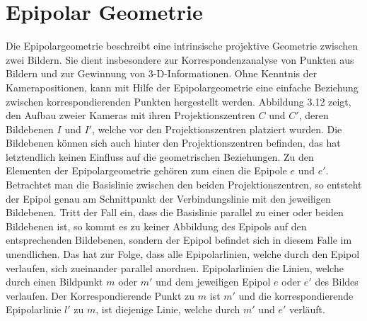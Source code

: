 \chapter{Epipolar Geometrie}


Die Epipolargeometrie beschreibt eine intrinsische projektive Geometrie zwischen zwei Bildern\cite{HZ}. Sie dient insbesondere zur Korrespondenzanalyse von Punkten aus Bildern und zur Gewinnung von 3-D-Informationen. Ohne Kenntnis der Kamerapositionen, kann mit Hilfe der Epipolargeometrie eine einfache Beziehung zwischen korrespondierenden Punkten hergestellt werden. Abbildung 3.12 zeigt, den Aufbau zweier Kameras mit ihren Projektionszentren $C$ und $C'$, deren Bildebenen $I$ und $I'$, welche vor den Projektionszentren platziert wurden. Die Bildebenen können sich auch hinter den Projektionszentren befinden, das hat letztendlich keinen Einfluss auf die geometrischen Beziehungen\cite{HZ}. Zu den Elementen der Epipolargeometrie gehören zum einen die Epipole $e$ und $e'$. Betrachtet man die Basislinie zwischen den beiden Projektionszentren, so entsteht der Epipol genau am Schnittpunkt der Verbindungslinie mit den jeweiligen Bildebenen. Tritt der Fall ein, dass die Basislinie parallel zu einer oder beiden Bildebenen ist, so kommt es zu keiner Abbildung des Epipols auf den entsprechenden Bildebenen, sondern der Epipol befindet sich in diesem Falle im unendlichen\cite{ZZGXr}. Das hat zur Folge, dass alle Epipolarlinien, welche durch den Epipol verlaufen, sich zueinander parallel anordnen. Epipolarlinien die Linien, welche durch einen Bildpunkt $m$ oder $m'$ und dem jeweiligen Epipol $e$ oder $e'$ des Bildes verlaufen. Der Korrespondierende Punkt zu $m$ ist $m'$ und die korrespondierende Epipolarlinie $l'$ zu $m$, ist diejenige Linie, welche durch $m'$ und $e'$ verläuft. 


